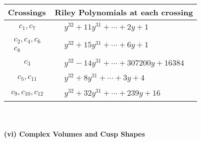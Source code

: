 \documentclass[1p]{elsarticle_modified}
\theoremstyle{definition}
\begin{document}
\begin{tabular}{m{50pt}|m{274pt}}
Crossings & \hspace{64pt}Riley Polynomials at each crossing \\
\hline $$\begin{aligned}c_{1},c_{7}\end{aligned}$$&$\begin{aligned}
&y^{32}+11 y^{31}+\cdots+2 y+1
\end{aligned}$\\
\hline $$\begin{aligned}c_{2},c_{4},c_{6}\\c_{8}\end{aligned}$$&$\begin{aligned}
&y^{32}+15 y^{31}+\cdots+6 y+1
\end{aligned}$\\
\hline $$\begin{aligned}c_{3}\end{aligned}$$&$\begin{aligned}
&y^{32}-14 y^{31}+\cdots+307200 y+16384
\end{aligned}$\\
\hline $$\begin{aligned}c_{5},c_{11}\end{aligned}$$&$\begin{aligned}
&y^{32}+8 y^{31}+\cdots+3 y+4
\end{aligned}$\\
\hline $$\begin{aligned}c_{9},c_{10},c_{12}\end{aligned}$$&$\begin{aligned}
&y^{32}+32 y^{31}+\cdots+239 y+16
\end{aligned}$\\
\hline
\end{tabular}\\~\\
\newpage\flushleft \textbf{(vi) Complex Volumes and Cusp Shapes}
\end{document}
